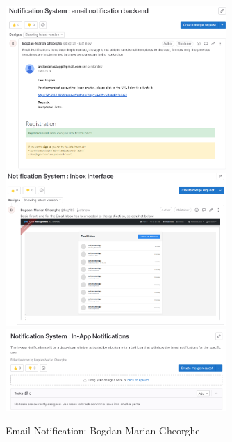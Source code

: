 \documentclass[a4paper]{article}
\begin{document}
\begin{figure}[H]
	\centering
	\includegraphics[width=0.75\textwidth]{./images/Email_backend.png}
	\includegraphics[width=0.75\textwidth]{./images/Email_Inbox_Interface.png}
	\includegraphics[width=0.75\textwidth]{./images/Email_Inapp.png}
	\caption*{Email Notification: Bogdan-Marian Gheorghe }
	\label{Fig.Email}
\end{figure}
\end{document}
